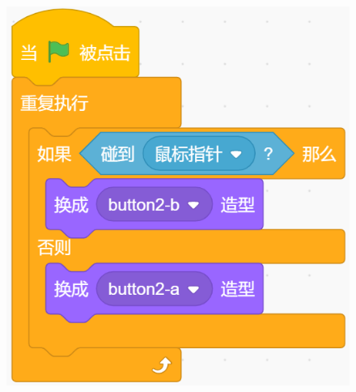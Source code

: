 \documentclass[10pt, a4paper]{article}
\begin{document}
\begin{figure}[htbp]
\begin{minipage}[t]{.33\textwidth}
\begin{minipage}[t]{.55\textwidth}
                \includegraphics[width=\textwidth]{28-2.png}
            \end{minipage}
            \begin{minipage}[t]{.33\textwidth}
                \centering

\end{minipage}
\end{minipage}
\end{figure}
\end{document}
